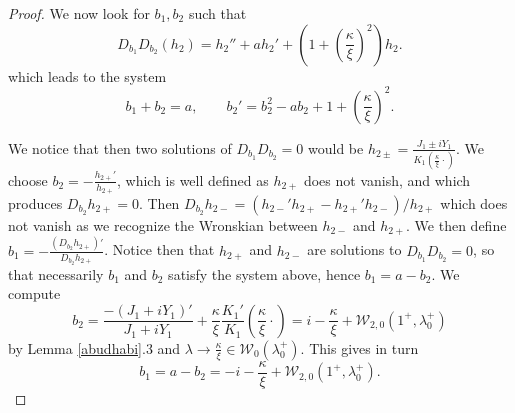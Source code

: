 \documentclass[11 pt]{amsart}
\theoremstyle{definition}
\theoremstyle{remark}
\numberwithin{equation}{section}
\begin{document}
\begin{proof}
  We now look for $b_1, b_2$ such that
  \[ D_{b_1} D_{b_2} (h_2) = h_2'' + a h_2' + \left( 1 + \left(
     \frac{\kappa}{\xi} \right)^2 \right) h_2. \]
     which leads to the system
  \[ b_1 + b_2 = a, \qquad b_2' = b_2^2 - a b_2 + 1 + \left( \frac{\kappa}{\xi}
     \right)^2. \]

We notice that then two solutions of $D_{b_1} D_{b_2}=0$ would be $h_{2\pm}=\frac{J_1\pm i Y_1}{K_1(\frac{\kappa}{\xi}\cdot)}$. We choose $b_2=-\frac{h_{2+}'}{h_{2+}}$, which is well defined as $h_{2+}$ does not vanish, and which produces $D_{b_2}h_{2+}=0$. Then $D_{b_2}h_{2-}=(h_{2-}'h_{2+}-h_{2+}'h_{2-})/h_{2+}$ which does not vanish as we recognize the Wronskian between $h_{2-}$ and $h_{2+}$. We then define $b_1=-\frac{(D_{b_2}h_{2+})'}{D_{b_2}h_{2+}}$. Notice then that $h_{2+}$ and $h_{2-}$ are solutions to $D_{b_1} D_{b_2}=0$, so that necessarily $b_1$ and $b_2$ satisfy the system above, hence $b_1=a-b_2$. We compute
\begin{equation} \label{computation-b2-exponential}
b_2=\frac{-(J_1+iY_1)'}{J_1+iY_1}+\frac{\kappa}{\xi}\frac{K_1'}{K_1}\left(\frac{\kappa}{\xi}\cdot\right)=i-\frac{\kappa}{\xi}+\mathcal W_{2,0}(1^+,\lambda_0^+)
\end{equation}
by Lemma \ref{abudhabi}.3 and $\lambda \rightarrow \frac{\kappa}{\xi} \in
  \mathcal{W}_0 (\lambda_0^+)$. This gives in turn
$$
b_1=a-b_2=-i-\frac{\kappa}{\xi}+\mathcal W_{2,0}(1^+,\lambda_0^+).
$$


\end{proof}
\end{document}
